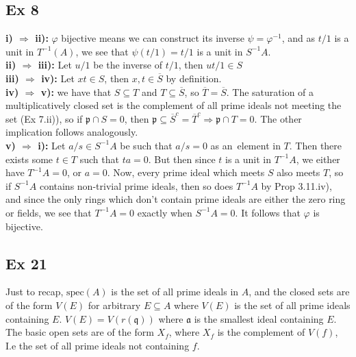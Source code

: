 \documentclass{article}
\let\temp\phi
\let\phi\varphi
\let\varphi\temp
\theoremstyle{definition}
\newcommand{\spec}{\text{spec}}
\begin{document}
\subsection*{Ex 8}

\textbf{i) $\Rightarrow$ ii):}
$\phi$ bijective means we can construct its inverse $\psi = \phi^{-1}$, and as
$t/1$ is a unit in $T^{-1}(A)$, we see that $\psi(t/1) = t/1$ is a unit in
$S^{-1}A$. \\

\textbf{ii) $\Rightarrow$ iii):}
Let $u/1$ be the inverse of $t/1$, then $ut/1 \in S$ \\

\textbf{iii) $\Rightarrow$ iv):}
Let $xt \in S$, then $x, t \in \overline{S}$ by definition. \\

\textbf{iv) $\Rightarrow$ v):}
we have that $S \subseteq T$ and $T \subseteq \overline{S}$, so $\overline{T} =
\overline{S}$. The saturation of a multiplicatively closed set is the
complement of all prime ideals not meeting the set (Ex 7.ii)), so if
$\mathfrak{p} \cap S = 0$, then $\mathfrak{p} \subseteq \overline{S}^{c} =
\overline{T}^{c} \Rightarrow \mathfrak{p} \cap T = 0$. The other implication
follows analogously. \\

\textbf{v) $\Rightarrow$ i):}
Let $a/s \in S^{-1}A$ be such that $a/s = 0$ as an element in $T$. Then there
exists some $t \in T$ such that $ta = 0$. But then since $t$ is a unit in
$T^{-1}A$, we either have $T^{-1}A = 0$, or $a = 0$. Now, every prime ideal
which meets $S$ also meets $T$, so if $S^{-1}A$ contains non-trivial prime
ideals, then so does $T^{-1}A$ by Prop 3.11.iv), and since the only rings which
don't contain prime ideals are either the zero ring or fields, we see that
$T^{-1}A = 0$ exactly when $S^{-1}A = 0$. It follows that $\phi$ is bijective.



\subsection*{Ex 21}

Just to recap, $\spec(A)$ is the set of all prime ideals in $A$, and the closed
sets are of the form $V(E)$ for arbitrary $E \subseteq A$ where $V(E)$ is the
set of all prime ideals containing $E$. $V(E) = V(r(\mathfrak{q}))$ where
$\mathfrak{a}$ is the smallest ideal containing $E$. The basic open sets are of
the form $X_f$, where $X_f$ is the complement of $V(f)$, I.e the set of all
prime ideals not containing $f$.
\end{document}
